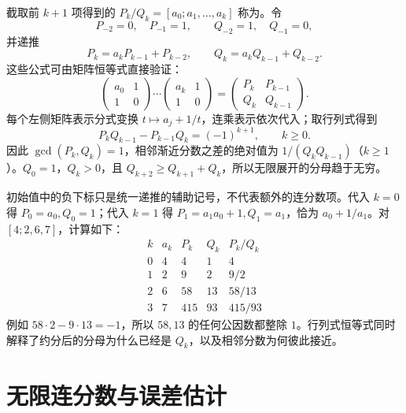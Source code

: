 \documentclass[UTF8,12pt,a4paper,fontset=fandol]{ctexbook}
\begin{document}
截取前 $k+1$ 项得到的 $P_k/Q_k=[a_0;a_1,\ldots,a_k]$ 称为。令
\begin{equation}
 P_{-2}=0,\quad P_{-1}=1,\qquad Q_{-2}=1,\quad Q_{-1}=0,
 \label{eq:convergent-initial}
\end{equation}
并递推
\begin{equation}
 P_k=a_kP_{k-1}+P_{k-2},\qquad
 Q_k=a_kQ_{k-1}+Q_{k-2}.
 \label{eq:convergent-recurrence}
\end{equation}
这些公式可由矩阵恒等式直接验证：
\[
 \begin{pmatrix}a_0&1\\1&0\end{pmatrix}\cdots
 \begin{pmatrix}a_k&1\\1&0\end{pmatrix}
 =\begin{pmatrix}P_k&P_{k-1}\\Q_k&Q_{k-1}\end{pmatrix}.
\]
每个左侧矩阵表示分式变换 $t\mapsto a_j+1/t$，连乘表示依次代入；取行列式得到
\begin{equation}
 P_kQ_{k-1}-P_{k-1}Q_k=(-1)^{k+1},\qquad k\ge0.
 \label{eq:convergent-determinant}
\end{equation}
因此 $\gcd(P_k,Q_k)=1$，相邻渐近分数之差的绝对值为 $1/(Q_kQ_{k-1})$（$k\ge1$）。$Q_0=1$，$Q_k>0$，且 $Q_{k+2}\ge Q_{k+1}+Q_k$，所以无限展开的分母趋于无穷。

初始值中的负下标只是统一递推的辅助记号，不代表额外的连分数项。代入 $k=0$ 得 $P_0=a_0,Q_0=1$；代入 $k=1$ 得 $P_1=a_1a_0+1,Q_1=a_1$，恰为 $a_0+1/a_1$。对 $[4;2,6,7]$，计算如下：
\[
\begin{array}{c|r|r|r|c}
k&a_k&P_k&Q_k&P_k/Q_k\\\hline
0&4&4&1&4\\
1&2&9&2&9/2\\
2&6&58&13&58/13\\
3&7&415&93&415/93
\end{array}
\]
例如 $58\cdot2-9\cdot13=-1$，所以 $58,13$ 的任何公因数都整除 $1$。行列式恒等式同时解释了约分后的分母为什么已经是 $Q_k$，以及相邻分数为何彼此接近。

\section{无限连分数与误差估计}
\end{document}
